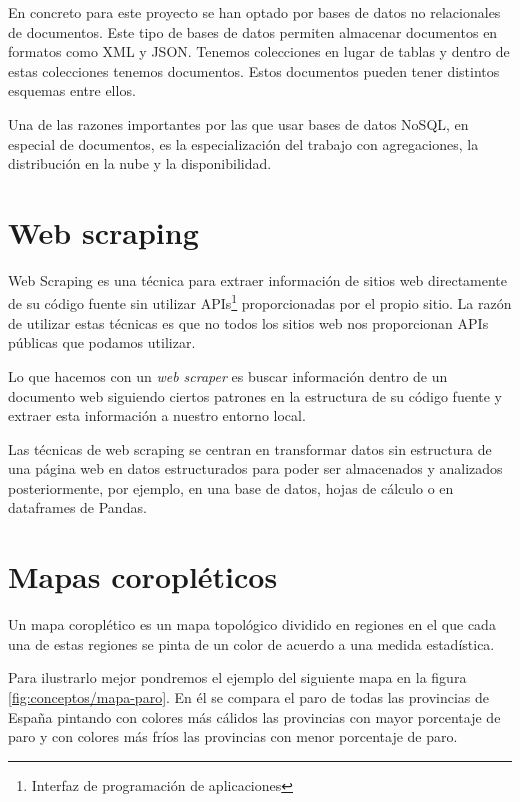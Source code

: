 En concreto para este proyecto se han optado por bases de datos no relacionales de documentos. Este tipo de bases de datos permiten almacenar documentos en formatos como XML y JSON. Tenemos colecciones en lugar de tablas y dentro de estas colecciones tenemos documentos. Estos documentos pueden tener distintos esquemas entre ellos.

Una de las razones importantes por las que usar bases de datos NoSQL, en especial de documentos, es la especialización del trabajo con agregaciones, la distribución en la nube y la disponibilidad.

\section{Web scraping} \label{webscraping}

Web Scraping \cite{wiki:webscraping} es una técnica para extraer información de sitios web directamente de su código fuente sin utilizar APIs\footnote{Interfaz de programación de aplicaciones} proporcionadas por el propio sitio. La razón de utilizar estas técnicas es que no todos los sitios web nos proporcionan APIs públicas que podamos utilizar.

Lo que hacemos con un \textit{web scraper} es buscar información dentro de un documento web siguiendo ciertos patrones en la estructura de su código fuente y extraer esta información a nuestro entorno local.

Las técnicas de web scraping se centran en transformar datos sin estructura de una página web en datos estructurados para poder ser almacenados y analizados posteriormente, por ejemplo, en una base de datos, hojas de cálculo o en dataframes de Pandas.


\section{Mapas coropléticos} \label{mapascoropleticos}

Un mapa coroplético \cite{wiki:mapascoropleticos} es un mapa topológico dividido en regiones en el que cada una de estas regiones se pinta de un color de acuerdo a una medida estadística.

Para ilustrarlo mejor pondremos el ejemplo del siguiente mapa en la figura \ref{fig:conceptos/mapa-paro}. En él se compara el paro de todas las provincias de España pintando con colores más cálidos las provincias con mayor porcentaje de paro y con colores más fríos las provincias con menor porcentaje de paro.


